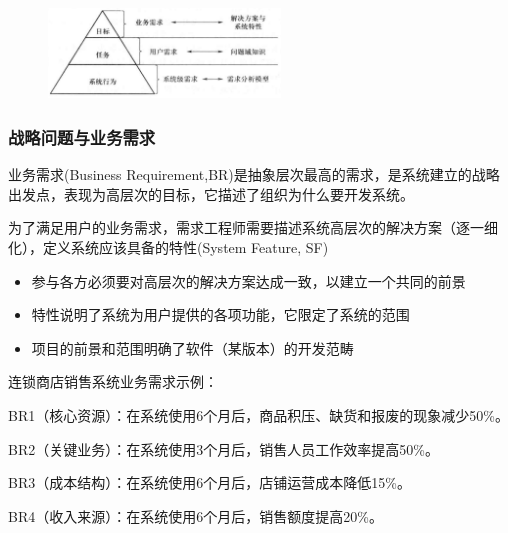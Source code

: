 \begin{figure}[H]
	\centering
	\includegraphics[width=0.55\textwidth]{img/需求的层次性.png}
\end{figure}


\subsubsection{战略问题与业务需求}
业务需求(Business Requirement,BR)是抽象层次最高的需求，是系统建立的战略出发点，表现为高层次的目标，它描述了组织为什么要开发系统。

为了满足用户的业务需求，需求工程师需要描述系统高层次的解决方案（逐一细化），定义系统应该具备的特性(System Feature, SF)
\begin{itemize}
    \item 参与各方必须要对高层次的解决方案达成一致，以建立一个共同的前景
    \item 特性说明了系统为用户提供的各项功能，它限定了系统的范围
    \item 项目的前景和范围明确了软件（某版本）的开发范畴
\end{itemize}

连锁商店销售系统业务需求示例：
\vspace{-0.25em}
{\kaishu \begin{compactitem}
    \item BR1（核心资源）：在系统使用6个月后，商品积压、缺货和报废的现象减少50\%。
    \item BR2（关键业务）：在系统使用3个月后，销售人员工作效率提高50\%。
    \item BR3（成本结构）：在系统使用6个月后，店铺运营成本降低15\%。
    \item BR4（收入来源）：在系统使用6个月后，销售额度提高20\%。
\end{compactitem}}

